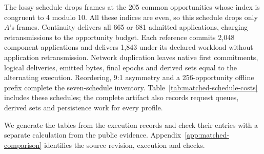 The lossy schedule drops frames at the 205 common opportunities whose index is
congruent to 4 modulo 10. All these indices are even, so this schedule
drops only $A$'s frames. Continuity delivers all 665 or 681 admitted
applications, charging retransmissions to the opportunity budget. Each
reference commits 2,048 component applications and delivers 1,843 under its
declared workload without application retransmission. Network duplication
leaves native first commitments, logical deliveries, emitted bytes, final
epochs and derived sets equal to the alternating execution. Reordering, 9:1
asymmetry and a 256-opportunity offline prefix complete the seven-schedule
inventory. Table~\ref{tab:matched-schedule-costs} includes these schedules;
the complete artifact also records request queues, derived sets and
persistence work for every profile.

We generate the tables from the execution records and check their entries
with a separate calculation from the public evidence.
Appendix~\ref{app:matched-comparison} identifies the source revision,
execution and checks.
